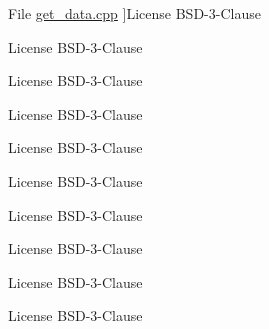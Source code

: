 \begin{DoxyRefList}
%
File \hyperlink{get__data_8cpp}{get\+\_\+data.cpp} ]License B\+S\+D-\/3-\/\+Clause  
\item[\label{license__license000002}%
\Hypertarget{license__license000002}%
File \hyperlink{main_8cpp}{main.cpp} ]License B\+S\+D-\/3-\/\+Clause  
\item[\label{license__license000024}%
\Hypertarget{license__license000024}%
File \hyperlink{serializable__exchange_8hpp}{serializable\+\_\+exchange.hpp} ]License B\+S\+D-\/3-\/\+Clause  
\item[\label{license__license000025}%
\Hypertarget{license__license000025}%
File \hyperlink{serializable__exchange_8hxx}{serializable\+\_\+exchange.hxx} ]License B\+S\+D-\/3-\/\+Clause 

License B\+S\+D-\/3-\/\+Clause  
\item[\label{license__license000009}%
\Hypertarget{license__license000009}%
File \hyperlink{set__data_8cpp}{set\+\_\+data.cpp} ]License B\+S\+D-\/3-\/\+Clause 

License B\+S\+D-\/3-\/\+Clause 

License B\+S\+D-\/3-\/\+Clause  
\item[\label{license__license000030}%
\Hypertarget{license__license000030}%
File \hyperlink{shared__memory_8cpp}{shared\+\_\+memory.cpp} ]License B\+S\+D-\/3-\/\+Clause  
\item[\label{license__license000023}%
\Hypertarget{license__license000023}%
File \hyperlink{shared__memory_8hpp}{shared\+\_\+memory.hpp} ]License B\+S\+D-\/3-\/\+Clause 


\end{DoxyRefList}
